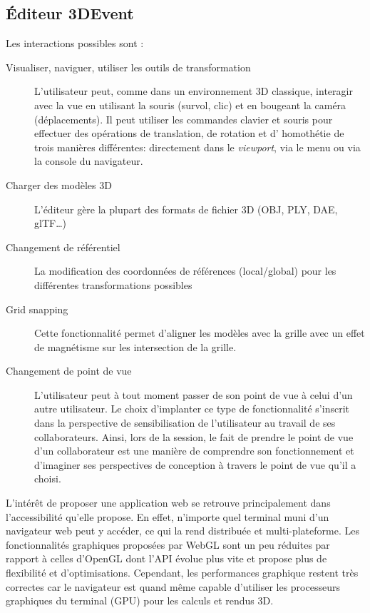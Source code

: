 \subsection{Éditeur 3DEvent}


Les interactions possibles sont : 
\begin{description}
	
	\item[Visualiser, naviguer, utiliser les outils de transformation] L'utilisateur peut, 
	com\-me dans un environnement 3D classique, interagir avec la vue en utilisant 
	la souris (survol, clic) et en bougeant la caméra (déplacements). Il peut 
	utiliser les commandes clavier et souris pour effectuer des opérations de 
	translation, de rotation et d' homothétie de trois manières différentes: directement dans le \textit{viewport}, via le 
	menu ou via la console du navigateur.
	\item[Charger des modèles 3D] L'éditeur gère la plupart des formats de fichier 
	3D (OBJ, PLY, DAE, glTF\ldots)
	\item[Changement de référentiel] La modification des coordonnées de 
	réfé\-ren\-ces (local/global)  pour les différentes transformations possibles
	\item[Grid snapping] Cette fonctionnalité permet d'aligner les modèles avec la 
	grille avec un effet de magnétisme sur les intersection de la grille.
	\item[Changement de point de vue] L'utilisateur peut à tout moment passer de 
	son point de vue à celui d'un autre utilisateur. Le choix d'implanter ce type de 
	fonctionnalité s'inscrit dans la perspective de sensibilisation de l'utilisateur au 
	travail de ses collaborateurs. Ainsi, lors de la session, le fait de prendre le 
	point de vue d'un collaborateur est une manière de 
	comprendre son fonctionnement et d'imaginer ses 
	perspectives de conception à travers le point de vue qu'il a choisi.
\end{description}

L'intérêt de proposer une application web se retrouve principalement dans 
l'accessibilité qu'elle propose. En effet, n'importe quel terminal muni d'un 
navigateur web peut y accéder, ce qui la rend distribuée et multi-plateforme. 
Les fonctionnalités graphiques proposées par WebGL sont un peu réduites par 
rapport à celles d'OpenGL dont l'\gls{API} évolue plus vite et propose plus de 
flexibilité et d'optimisations. Cependant, les performances graphique restent très 
correctes car le navigateur est quand même capable d'utiliser les processeurs 
graphiques du terminal (GPU) pour les calculs et rendus 3D.

